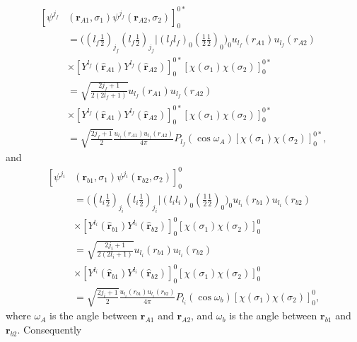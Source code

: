 \begin{equation}\label{eq145}
 \begin{split}
\left[ \psi ^{j_f}\right.& \left.(\mathbf{r}_{A1},\sigma_1) \psi ^{j_f} (\mathbf{r}_{A2},\sigma_2) \right] _0^{0*}\\
&=\bigl ( (l_f \tfrac{1}{2})_{j_f} (l_f \tfrac{1}{2})_{j_f} |(l_f l_f)_0 (\tfrac{1}{2}\tfrac{1}{2})_0 \bigr )_0 u_{l_f}(r_{A1})u_{l_f}(r_{A2})\\
&\times \left[ Y ^{l_f}(\hat{\mathbf{r}}_{A1})  Y ^{l_f}(\hat{\mathbf{r}}_{A2}) \right] _0^{0*}\left[\chi(\sigma_1)\chi(\sigma_2)\right]^{0*}_{0}\\
&=\sqrt{\frac{2j_f+1}{2(2l_f+1)}}u_{l_f}(r_{A1})u_{l_f}(r_{A2})\\
&\times \left[ Y ^{l_f}(\hat{\mathbf{r}}_{A1})  Y ^{l_f}(\hat{\mathbf{r}}_{A2}) \right] _0^{0*}\left[\chi(\sigma_1)\chi(\sigma_2)\right]^{0*}_{0}\\
&=\sqrt{\frac{2j_f+1}{2}}\frac{u_{l_f}(r_{A1})u_{l_f}(r_{A2})}{4\pi}
P_{l_f}(\cos\omega_A)\left[\chi(\sigma_1)\chi(\sigma_2)\right]^{0*}_{0},
\end{split}
\end{equation}
and
\begin{equation}\label{eq146}
 \begin{split}
\left[ \psi ^{j_i}\right.& \left.(\mathbf{r}_{b1},\sigma_1) \psi ^{j_i} (\mathbf{r}_{b2},\sigma_2) \right] _0^{0}\\
&=\bigl ( (l_i \tfrac{1}{2})_{j_i} (l_i \tfrac{1}{2})_{j_i} |(l_i l_i)_0 (\tfrac{1}{2}\tfrac{1}{2})_0 \bigr )_0
u_{l_i}(r_{b1})u_{l_i}(r_{b2})\\
&\times \left[ Y ^{l_i}(\hat{\mathbf{r}}_{b1})  Y ^{l_i}(\hat{\mathbf{r}}_{b2}) \right] _0^{0}\left[\chi(\sigma_1)\chi(\sigma_2)\right]^{0}_{0}\\
&=\sqrt{\frac{2j_i+1}{2(2l_i+1)}}u_{l_i}(r_{b1})u_{l_i}(r_{b2})\\
&\times\left[ Y ^{l_i}(\hat{\mathbf{r}}_{b1})  Y ^{l_i}(\hat{\mathbf{r}}_{b2}) \right] _0^{0}\left[\chi(\sigma_1)\chi(\sigma_2)\right]^{0}_{0}\\
&=\sqrt{\frac{2j_i+1}{2}}\frac{u_{l_i}(r_{b1})u_{l_i}(r_{b2})}{4\pi}
P_{l_i}(\cos\omega_b)\left[\chi(\sigma_1)\chi(\sigma_2)\right]^{0}_{0},
\end{split}
\end{equation}
where $\omega_A$ is the angle between $\mathbf{r}_{A1}$ and $\mathbf{r}_{A2}$, and $\omega_b$ is the angle between $\mathbf{r}_{b1}$ and $\mathbf{r}_{b2}$. Consequently
